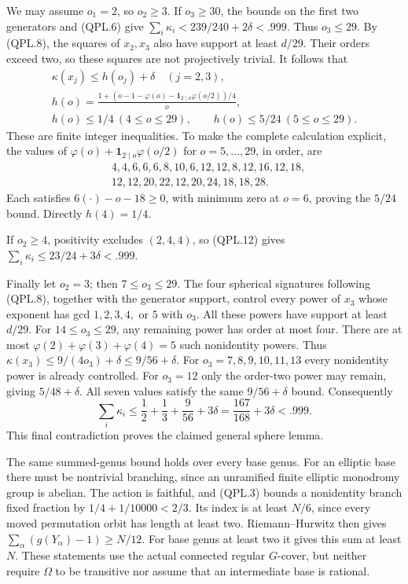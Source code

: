 We may assume \(o_1=2\), so \(o_2\ge3\).
If \(o_3\ge30\), the bounds on the first two generators and
(QPL.6) give
\(\sum_i\kappa_i<239/240+2\delta<.999\).
Thus \(o_3\le29\).
By (QPL.8), the squares of \(x_2,x_3\) also have support
at least \(d/29\). Their orders exceed two, so these squares
are not projectively trivial.
It follows that
\[
 \begin{gathered}
 \kappa(x_j)\le h(o_j)+\delta\quad(j=2,3),\\
 h(o)=\frac{1+(o-1-\varphi(o)
                   -{\boldsymbol 1}_{2\mid o}\varphi(o/2))/4}{o},\\
 h(o)\le1/4\ (4\le o\le29),\qquad
 h(o)\le5/24\ (5\le o\le29).
 \end{gathered}
 \tag{QPL.12}
\]
These are finite integer inequalities. To make the complete
calculation explicit, the values of
\(\varphi(o)+{\boldsymbol 1}_{2\mid o}\varphi(o/2)\)
for \(o=5,\ldots,29\), in order, are
\[
 \begin{split}
 &4,4,6,6,6,8,10,6,12,12,8,12,16,12,18,\\
 &12,12,20,22,12,20,24,18,18,28.
 \end{split}
 \tag{QPL.13}
\]
Each satisfies \(6(\cdot)-o-18\ge0\), with minimum zero at
\(o=6\), proving the \(5/24\) bound. Directly \(h(4)=1/4\).

If \(o_2\ge4\), positivity excludes \((2,4,4)\), so
(QPL.12) gives
\(\sum_i\kappa_i\le23/24+3\delta<.999\).

Finally let \(o_2=3\); then \(7\le o_3\le29\).
The four spherical signatures following (QPL.8), together
with the generator support, control every power of \(x_3\)
whose exponent has gcd \(1,2,3,4,\) or \(5\) with \(o_3\).
All these powers have support at least \(d/29\).
For \(14\le o_3\le29\), any remaining power has order at
most four. There are at most
\(\varphi(2)+\varphi(3)+\varphi(4)=5\) such nonidentity
powers. Thus \(\kappa(x_3)\le9/(4o_3)+\delta\le9/56+\delta\).
For \(o_3=7,8,9,10,11,13\) every nonidentity power is
already controlled. For \(o_3=12\) only the order-two
power may remain, giving \(5/48+\delta\).
All seven values satisfy the same \(9/56+\delta\) bound.
Consequently
\[
                \sum_i\kappa_i\le
                   \frac12+\frac13+\frac9{56}+3\delta
                    =\frac{167}{168}+3\delta<.999.
 \tag{QPL.14}
\]
This final contradiction proves the claimed general sphere lemma.

The same summed-genus bound holds over every base genus.
For an elliptic base there must be nontrivial branching, since
an unramified finite elliptic monodromy group is abelian.
The action is faithful, and (QPL.3) bounds a nonidentity
branch fixed fraction by \(1/4+1/10000<2/3\). Its index is
at least \(N/6\), since every moved permutation orbit has
length at least two. Riemann--Hurwitz then gives
\(\sum_\alpha(g(Y_\alpha)-1)\ge N/12\).
For base genus at least two it gives this sum at least \(N\).
These statements use the actual connected regular \(G\)-cover,
but neither require \(\Omega\) to be transitive nor assume
that an intermediate base is rational.

